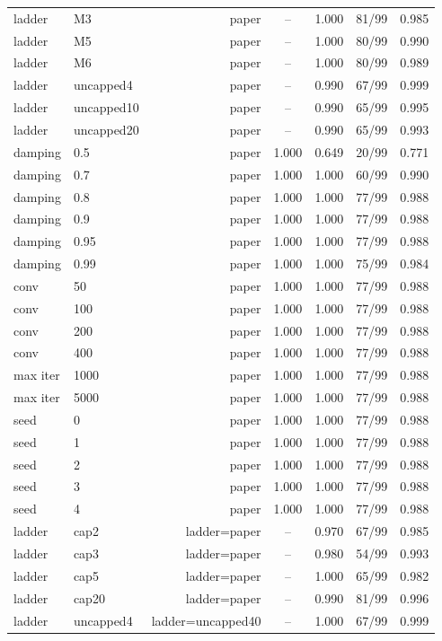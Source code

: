 \begin{tabular*}{\linewidth}{@{\extracolsep{\fill}}llrcccc@{}}
ladder & M3 & paper & -- & 1.000 & 81/99 & 0.985\\
ladder & M5 & paper & -- & 1.000 & 80/99 & 0.990\\
ladder & M6 & paper & -- & 1.000 & 80/99 & 0.989\\
ladder & uncapped4 & paper & -- & 0.990 & 67/99 & 0.999\\
ladder & uncapped10 & paper & -- & 0.990 & 65/99 & 0.995\\
ladder & uncapped20 & paper & -- & 0.990 & 65/99 & 0.993\\
damping & 0.5 & paper & 1.000 & 0.649 & 20/99 & 0.771\\
damping & 0.7 & paper & 1.000 & 1.000 & 60/99 & 0.990\\
damping & 0.8 & paper & 1.000 & 1.000 & 77/99 & 0.988\\
damping & 0.9 & paper & 1.000 & 1.000 & 77/99 & 0.988\\
damping & 0.95 & paper & 1.000 & 1.000 & 77/99 & 0.988\\
damping & 0.99 & paper & 1.000 & 1.000 & 75/99 & 0.984\\
conv & 50 & paper & 1.000 & 1.000 & 77/99 & 0.988\\
conv & 100 & paper & 1.000 & 1.000 & 77/99 & 0.988\\
conv & 200 & paper & 1.000 & 1.000 & 77/99 & 0.988\\
conv & 400 & paper & 1.000 & 1.000 & 77/99 & 0.988\\
max iter & 1000 & paper & 1.000 & 1.000 & 77/99 & 0.988\\
max iter & 5000 & paper & 1.000 & 1.000 & 77/99 & 0.988\\
seed & 0 & paper & 1.000 & 1.000 & 77/99 & 0.988\\
seed & 1 & paper & 1.000 & 1.000 & 77/99 & 0.988\\
seed & 2 & paper & 1.000 & 1.000 & 77/99 & 0.988\\
seed & 3 & paper & 1.000 & 1.000 & 77/99 & 0.988\\
seed & 4 & paper & 1.000 & 1.000 & 77/99 & 0.988\\
ladder & cap2 & ladder=paper & -- & 0.970 & 67/99 & 0.985\\
ladder & cap3 & ladder=paper & -- & 0.980 & 54/99 & 0.993\\
ladder & cap5 & ladder=paper & -- & 1.000 & 65/99 & 0.982\\
ladder & cap20 & ladder=paper & -- & 0.990 & 81/99 & 0.996\\
ladder & uncapped4 & ladder=uncapped40 & -- & 1.000 & 67/99 & 0.999\\

\end{tabular*}
